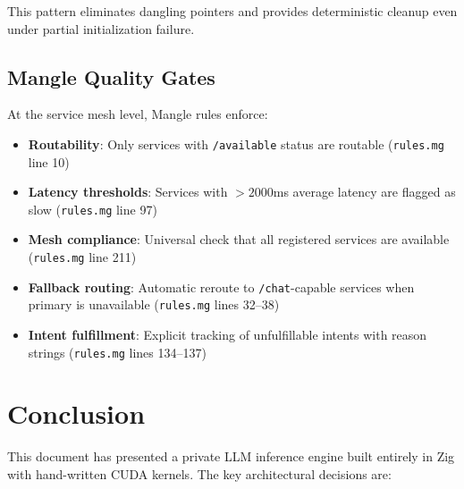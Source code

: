 \documentclass[11pt]{article}
\begin{document}
This pattern eliminates dangling pointers and provides deterministic cleanup
even under partial initialization failure.

\subsection{Mangle Quality Gates}

At the service mesh level, Mangle rules enforce:
\begin{itemize}
  \item \textbf{Routability}: Only services with \texttt{/available} status
        are routable (\texttt{rules.mg} line 10)
  \item \textbf{Latency thresholds}: Services with $>2000$ms average latency
        are flagged as slow (\texttt{rules.mg} line 97)
  \item \textbf{Mesh compliance}: Universal check that all registered services
        are available (\texttt{rules.mg} line 211)
  \item \textbf{Fallback routing}: Automatic reroute to \texttt{/chat}-capable
        services when primary is unavailable (\texttt{rules.mg} lines 32--38)
  \item \textbf{Intent fulfillment}: Explicit tracking of unfulfillable intents
        with reason strings (\texttt{rules.mg} lines 134--137)
\end{itemize}

\section{Conclusion}
\label{sec:conclusion}

This document has presented a private LLM inference engine built entirely in
Zig with hand-written CUDA kernels. The key architectural decisions are:
\end{document}
